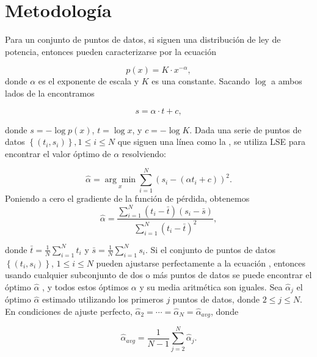 \section{Metodología}

Para un conjunto de puntos de datos, si siguen una distribución de ley de potencia, entonces pueden caracterizarse por la ecuación

\begin{equation}\label{eq:92}
	p(x)=K\cdot x^{-\alpha},
\end{equation}
donde $\alpha$ es el exponente de escala y $K$ es una constante. Sacando $\log$ a ambos lados de la  encontramos 

\begin{equation}\label{eq:93}
	s=\alpha\cdot t+ c,
\end{equation}

donde $s=-\log p(x)$, $t=\log x$, y $c=-\log K$. Dada una serie de puntos de datos $\left\{(t_i,s_i)\right\}, 1 \leq i\leq N$ que siguen una línea como la  , se utiliza  LSE para encontrar el valor óptimo de $\alpha$ resolviendo:

\begin{equation}
	\hat{\alpha}=\underset{x}{\arg\min}  \sum_{i=1}^{N} \left(s_i-\left(\alpha t_i+c\right)\right)^2.
\end{equation}
Poniendo a cero el gradiente de la función de pérdida, obtenemos
\begin{equation}\label{eq:94}
	\hat{\alpha}=\frac{\sum_{i=1}^{N}\left(t_i-\bar{t}\right)\left(s_i-\bar{s}\right)}{\sum_{i=1}^{N}\left(t_i-\bar{t}\right)^2},
\end{equation}

donde $\bar{t}=\frac{1}{N}\sum_{i=1}^{N}t_i$ y $\bar{s}=\frac{1}{N}\sum_{i=1}^{N}s_i.$ Si el conjunto de puntos de datos $\left\{\left(t_i,s_i\right)\right\}$, $1\leq i \leq N$  pueden ajustarse perfectamente a la ecuación , entonces usando cualquier subconjunto de dos o más puntos de datos se puede encontrar el óptimo $\hat{\alpha}$ , y todos estos óptimos $\alpha$ y su media aritmética son iguales. Sea $\hat{\alpha}_j$ el  óptimo  $\hat{\alpha}$ estimado utilizando los primeros $j$ puntos de datos, donde $2\leq j \leq N$. En condiciones de ajuste perfecto, $\hat{\alpha}_2=\cdots=\hat{\alpha}_N=\hat{\alpha}_{avg}$, donde 

\begin{equation}\label{eq:95}
	\hat{\alpha}_{avg}=\frac{1}{N-1}\sum_{j=2}^{N}\hat{\alpha}_j.
\end{equation}

